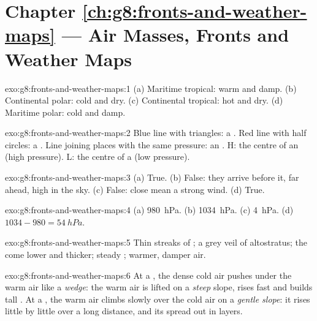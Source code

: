 \section*{Chapter \ref{ch:g8:fronts-and-weather-maps} --- Air Masses, Fronts and Weather Maps}

\begin{solution}{exo:g8:fronts-and-weather-maps:1}
(a) Maritime tropical: warm and damp. (b) Continental polar: cold and
dry. (c) Continental tropical: hot and dry. (d) Maritime polar: cold and
damp.
\end{solution}

\begin{solution}{exo:g8:fronts-and-weather-maps:2}
Blue line with triangles: a . Red line with half circles: a
. Line joining places with the same pressure: an . H: the
centre of an  (high pressure). L: the centre of a 
(low pressure).
\end{solution}

\begin{solution}{exo:g8:fronts-and-weather-maps:3}
(a) True. (b) False: they arrive before it, far ahead, high in the sky.
(c) False: close  mean a strong wind. (d) True.
\end{solution}

\begin{solution}{exo:g8:fronts-and-weather-maps:4}
(a) \qty{980}{hPa}. (b) \qty{1034}{hPa}. (c) \qty{4}{hPa}. (d) $1034 -
980 = \qty{54}{hPa}$.
\end{solution}

\begin{solution}{exo:g8:fronts-and-weather-maps:5}
Thin streaks of ; a grey veil of altostratus; the  come lower
and thicker; steady ; warmer, damper air.
\end{solution}

\begin{solution}{exo:g8:fronts-and-weather-maps:6}
At a , the dense cold air pushes under the warm air like a
\emph{wedge}: the warm air is lifted on a \emph{steep} slope, rises fast
and builds tall . At a , the warm air climbs slowly over
the cold air on a \emph{gentle slope}: it rises little by little over a
long distance, and its  spread out in layers.
\end{solution}

